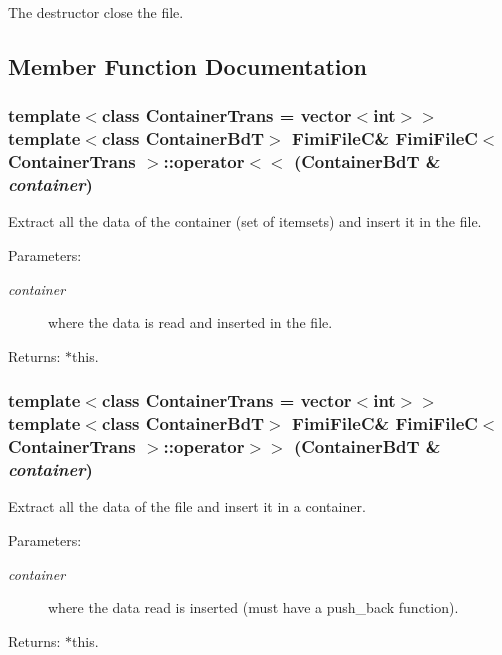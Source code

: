 The destructor close the file. 

\subsection{Member Function Documentation}
\subsubsection{\setlength{\rightskip}{0pt plus 5cm}template$<$class Container\-Trans = vector$<$int$>$$>$ template$<$class Container\-Bd\-T$>$ {\bf Fimi\-File\-C}\& {\bf Fimi\-File\-C}$<$ Container\-Trans $>$::operator$<$$<$ (Container\-Bd\-T \& {\em container})\hspace{0.3cm}{\tt  [inline]}}\label{class_fimi_file_c_952a5287a5e0bd89f2315e256f5779ea}


Extract all the data of the container (set of itemsets) and insert it in the file. 

\begin{Desc}
\item[Parameters:]
\begin{description}
\item[{\em container}]where the data is read and inserted in the file. \end{description}
\end{Desc}
\begin{Desc}
\item[Returns:]$\ast$this. \end{Desc}
\subsubsection{\setlength{\rightskip}{0pt plus 5cm}template$<$class Container\-Trans = vector$<$int$>$$>$ template$<$class Container\-Bd\-T$>$ {\bf Fimi\-File\-C}\& {\bf Fimi\-File\-C}$<$ Container\-Trans $>$::operator$>$$>$ (Container\-Bd\-T \& {\em container})\hspace{0.3cm}{\tt  [inline]}}\label{class_fimi_file_c_9fce5b0d9029c5129d8faa49db675ab7}


Extract all the data of the file and insert it in a container. 

\begin{Desc}
\item[Parameters:]
\begin{description}
\item[{\em container}]where the data read is inserted (must have a push\_\-back function). \end{description}
\end{Desc}
\begin{Desc}
\item[Returns:]$\ast$this. \end{Desc}
